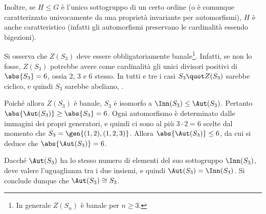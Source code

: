 \documentclass[12pt]{scrartcl}
\begin{document}
	
	Inoltre, se $H \leq G$ è l'unico sottogruppo di un certo ordine (o è comunque
	caratterizzato univocamente da una proprietà invariante per automorfismi),
	$H$ è anche caratteristico (infatti gli automorfismi preservano le cardinalità essendo
	bigezioni). \bigskip
	
	
	\begin{example}
		Si osserva che $Z(S_3)$ deve essere obbligatoriamente
		banale\footnote{
			In generale $Z(S_n)$ è banale per $n \geq 3$.
		}. Infatti, se non lo fosse, $Z(S_3)$ potrebbe
		avere come cardinalità gli unici divisori positivi di
		$\abs{S_3} = 6$, ossia $2$, $3$ e $6$ stesso. In tutti
		e tre i casi $S_3 \quot Z(S_3)$ sarebbe ciclico, e quindi
		$S_3$ sarebbe abeliano, \Lightning. \medskip
		
		
		Poiché allora $Z(S_3)$ è banale, $S_3$ è isomorfo a
		$\Inn(S_3) \leq \Aut(S_3)$. Pertanto $\abs{\Aut(S_3)} \geq \abs{S_3} = 6$. Ogni automorfismo è
		determinato dalle immagini dei propri generatori, e quindi
		ci sono al più $3 \cdot 2 = 6$ scelte dal momento che
		$S_3 = \gen{(1,2), (1,2,3)}$. Allora
		$\abs{\Aut(S_3)} \leq 6$, da cui si deduce che
		$\abs{\Aut(S_3)} = 6$. \medskip
		
		
		Dacché $\Aut(S_3)$ ha lo stesso numero di elementi
		del suo sottogruppo $\Inn(S_3)$, deve valere l'uguaglianza
		tra i due insiemi, e quindi $\Aut(S_3) = \Inn(S_3)$. Si
		conclude dunque che $\Aut(S_3) \cong S_3$.
	\end{example}
\end{document}
